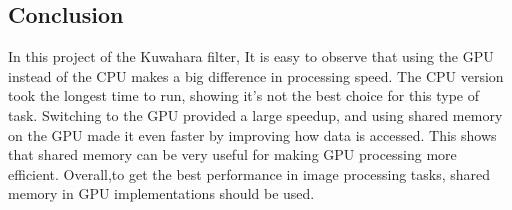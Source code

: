 \documentclass{article}
\begin{document}
\subsection{Conclusion}
In this project of the Kuwahara filter, It is easy to observe that using the GPU instead of the CPU makes a big difference in processing speed. The CPU version took the longest time to run, showing it’s not the best choice for this type of task. Switching to the GPU provided a large speedup, and using shared memory on the GPU made it even faster by improving how data is accessed. This shows that shared memory can be very useful for making GPU processing more efficient. Overall,to get the best performance in image processing tasks, shared memory in GPU implementations should be used.
\end{document}
